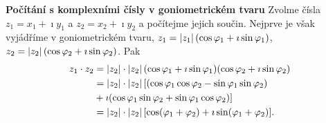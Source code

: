 \begin{mdframed}[style=mdexam]
  \begin{example}\label{mai:exam079}
    \textbf{Počítání s komplexními čísly v goniometrickém tvaru}\newline
      Zvolme čísla \(z_1 = x_1 + \imath y_1\) a \(z_2 = x_2 + \imath y_2\) a počítejme jejich
      součin. Nejprve je však vyjádříme v goniometrickém tvaru, \(z_1 =\left\lvert z_1\right\rvert(\cos\varphi_1 +
      \imath\sin\varphi_1)\), \(z_2 =\left\lvert z_2\right\rvert(\cos\varphi_2 + \imath\sin\varphi_2)\). Pak
      \begin{gather*}
        \begin{aligned}
          z_1\cdot z_2 &= \left\lvert z_2\right\rvert\cdot\left\lvert z_2\right\rvert(\cos\varphi_1 + \imath\sin\varphi_1)
                                                 (\cos\varphi_2 + \imath\sin\varphi_2)           \\
                      &= \left\lvert z_2\right\rvert\cdot\left\lvert z_2\right\rvert
                          [(\cos\varphi_1\cos\varphi_2 - \sin\varphi_1\sin\varphi_2)             \\ 
                      &+ \imath(\cos\varphi_1\sin\varphi_2 + \sin\varphi_1\cos\varphi_2)]        \\
                      &= \left\lvert z_2\right\rvert\cdot\left\lvert z_2\right\rvert
                          [\cos(\varphi_1 +\varphi_2) + \imath\sin(\varphi_1 +\varphi_2)].
        \end{aligned}
      \end{gather*}  
  \end{example}
\end{mdframed}